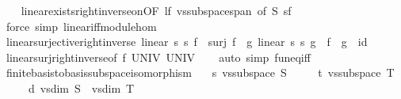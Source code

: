 \begin{isabellebody}
%
\isadelimproof
\ \ %
\endisadelimproof
%
\isatagproof
{}\isamarkupfalse%
\ linear{\isacharunderscore}{\kern0pt}exists{\isacharunderscore}{\kern0pt}right{\isacharunderscore}{\kern0pt}inverse{\isacharunderscore}{\kern0pt}on{\isacharbrackleft}{\kern0pt}OF\ lf\ vs{}{\isachardot}{\kern0pt}subspace{\isacharunderscore}{\kern0pt}span{\isacharcomma}{\kern0pt}\ of\ S{\isacharbrackright}{\kern0pt}\ sf\isanewline
\ \ \isamarkupfalse%
\ {\isacharparenleft}{\kern0pt}force\ simp{\isacharcolon}{\kern0pt}\ linear{\isacharunderscore}{\kern0pt}iff{\isacharunderscore}{\kern0pt}module{\isacharunderscore}{\kern0pt}hom{\isacharparenright}{\kern0pt}%
\endisatagproof
{\isafoldproof}%
%
\isadelimproof
\isanewline
%
\endisadelimproof
\isanewline
{}\isamarkupfalse%
\ linear{\isacharunderscore}{\kern0pt}surjective{\isacharunderscore}{\kern0pt}right{\isacharunderscore}{\kern0pt}inverse{\isacharcolon}{\kern0pt}\ {\isachardoublequoteopen}linear\ s{}\ s{}\ f\ {\isasymLongrightarrow}\ surj\ f\ {\isasymLongrightarrow}\ {\isasymexists}g{\isachardot}{\kern0pt}\ linear\ s{}\ s{}\ g\ {\isasymand}\ f\ {\isasymcirc}\ g\ {\isacharequal}{\kern0pt}\ id{\isachardoublequoteclose}\isanewline
%
\isadelimproof
\ \ %
\endisadelimproof
%
\isatagproof
{}\isamarkupfalse%
\ linear{\isacharunderscore}{\kern0pt}surj{\isacharunderscore}{\kern0pt}right{\isacharunderscore}{\kern0pt}inverse{\isacharbrackleft}{\kern0pt}of\ f\ UNIV\ UNIV{\isacharbrackright}{\kern0pt}\isanewline
\ \ \isamarkupfalse%
\ {\isacharparenleft}{\kern0pt}auto\ simp{\isacharcolon}{\kern0pt}\ fun{\isacharunderscore}{\kern0pt}eq{\isacharunderscore}{\kern0pt}iff{\isacharparenright}{\kern0pt}%
\endisatagproof
{\isafoldproof}%
%
\isadelimproof
\isanewline
%
\endisadelimproof
\isanewline
{}\isamarkupfalse%
\ finite{\isacharunderscore}{\kern0pt}basis{\isacharunderscore}{\kern0pt}to{\isacharunderscore}{\kern0pt}basis{\isacharunderscore}{\kern0pt}subspace{\isacharunderscore}{\kern0pt}isomorphism{\isacharcolon}{\kern0pt}\isanewline
\ \ \ s{\isacharcolon}{\kern0pt}\ {\isachardoublequoteopen}vs{}{\isachardot}{\kern0pt}subspace\ S{\isachardoublequoteclose}\isanewline
\ \ \ \ \ t{\isacharcolon}{\kern0pt}\ {\isachardoublequoteopen}vs{}{\isachardot}{\kern0pt}subspace\ T{\isachardoublequoteclose}\isanewline
\ \ \ \ \ d{\isacharcolon}{\kern0pt}\ {\isachardoublequoteopen}vs{}{\isachardot}{\kern0pt}dim\ S\ {\isacharequal}{\kern0pt}\ vs{}{\isachardot}{\kern0pt}dim\ T{\isachardoublequoteclose}\isanewline

\end{isabellebody}
